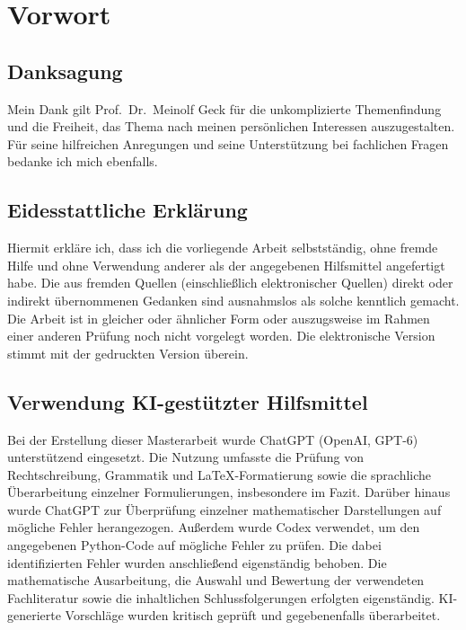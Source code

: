 \chapter*{Vorwort}

\section*[]{Danksagung}
Mein Dank gilt Prof.~Dr.~Meinolf Geck für die unkomplizierte Themenfindung und die Freiheit, das Thema nach meinen persönlichen Interessen auszugestalten. Für seine hilfreichen Anregungen und seine Unterstützung bei fachlichen Fragen bedanke ich mich ebenfalls.

\section*[]{Eidesstattliche Erklärung}
Hiermit erkläre ich, dass ich die vorliegende Arbeit selbstständig, ohne fremde Hilfe und ohne Verwendung anderer als der angegebenen Hilfsmittel angefertigt habe. Die aus fremden Quellen (einschließlich elektronischer Quellen) direkt oder indirekt übernommenen Gedanken sind ausnahmslos als solche kenntlich gemacht. Die Arbeit ist in gleicher oder ähnlicher Form oder auszugsweise im Rahmen einer anderen Prüfung noch nicht vorgelegt worden. Die elektronische Version stimmt mit der gedruckten Version überein. 

\bigskip\underline{\hspace{0.2\textwidth}}\hspace{0.1\textwidth}\underline{\hspace{0.4\textwidth}}
\section*[]{Verwendung KI-gestützter Hilfsmittel}
Bei der Erstellung dieser Masterarbeit wurde ChatGPT (OpenAI, GPT-6) unterstützend eingesetzt. Die Nutzung umfasste die Prüfung von Rechtschreibung, Grammatik und LaTeX-Formatierung sowie die sprachliche Überarbeitung einzelner Formulierungen, insbesondere im Fazit. Darüber hinaus wurde ChatGPT zur Überprüfung einzelner mathematischer Darstellungen auf mögliche Fehler herangezogen. Außerdem wurde Codex verwendet, um den angegebenen
Python-Code auf mögliche Fehler zu prüfen.
Die dabei identifizierten Fehler wurden anschließend eigenständig behoben.
Die mathematische Ausarbeitung, die Auswahl und Bewertung der verwendeten Fachliteratur sowie die inhaltlichen Schlussfolgerungen erfolgten eigenständig. KI-generierte Vorschläge wurden kritisch geprüft und gegebenenfalls überarbeitet.